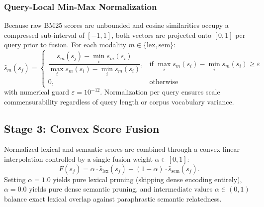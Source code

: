 \documentclass[conference]{IEEEtran}
\begin{document}
\subsubsection{Query-Local Min-Max Normalization}
Because raw BM25 scores are unbounded and cosine similarities occupy a compressed sub-interval of $[-1, 1]$, both vectors are projected onto $[0, 1]$ per query prior to fusion. For each modality $m \in \{\mathrm{lex}, \mathrm{sem}\}$:
\begin{equation}
\hat{s}_m(s_j) = \begin{cases}
\dfrac{s_m(s_j) - \min_i s_m(s_i)}{\max_i s_m(s_i) - \min_i s_m(s_i)}, & \text{if } \max_i s_m(s_i) - \min_i s_m(s_i) \ge \varepsilon \\
0, & \text{otherwise}
\end{cases}
\end{equation}
with numerical guard $\varepsilon = 10^{-12}$. Normalization per query ensures scale commensurability regardless of query length or corpus vocabulary variance.

\subsection{Stage 3: Convex Score Fusion}
Normalized lexical and semantic scores are combined through a convex linear interpolation controlled by a single fusion weight $\alpha \in [0, 1]$:
\begin{equation}
F(s_j) = \alpha \cdot \hat{s}_{\mathrm{lex}}(s_j) + (1 - \alpha) \cdot \hat{s}_{\mathrm{sem}}(s_j).
\label{eq:fusion}
\end{equation}
Setting $\alpha = 1.0$ yields pure lexical pruning (skipping dense encoding entirely), $\alpha = 0.0$ yields pure dense semantic pruning, and intermediate values $\alpha \in (0, 1)$ balance exact lexical overlap against paraphrastic semantic relatedness.
\end{document}
